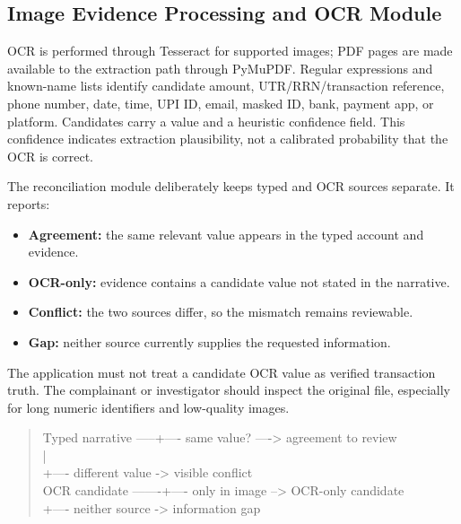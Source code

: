 \documentclass[12pt,a4paper,oneside]{report}
\begin{document}
\subsection{Image Evidence Processing and OCR Module}
OCR is performed through Tesseract for supported images; PDF pages are made available to the extraction path through PyMuPDF. Regular expressions and known-name lists identify candidate amount, UTR/RRN/transaction reference, phone number, date, time, UPI ID, email, masked ID, bank, payment app, or platform. Candidates carry a value and a heuristic confidence field. This confidence indicates extraction plausibility, not a calibrated probability that the OCR is correct.\par\medskip
The reconciliation module deliberately keeps typed and OCR sources separate. It reports:\par\medskip
\begin{itemize}
\item \textbf{Agreement:} the same relevant value appears in the typed account and evidence.
\item \textbf{OCR-only:} evidence contains a candidate value not stated in the narrative.
\item \textbf{Conflict:} the two sources differ, so the mismatch remains reviewable.
\item \textbf{Gap:} neither source currently supplies the requested information.
\end{itemize}
The application must not treat a candidate OCR value as verified transaction truth. The complainant or investigator should inspect the original file, especially for long numeric identifiers and low-quality images.\par\medskip
{}
\begin{quote}\ttfamily\footnotesize Typed narrative -----+---- same value? ----> agreement to review\\                     |\\                     +---- different value -> visible conflict\\OCR candidate -------+---- only in image --> OCR-only candidate\\                     +---- neither source -> information gap\end{quote}
\end{document}
